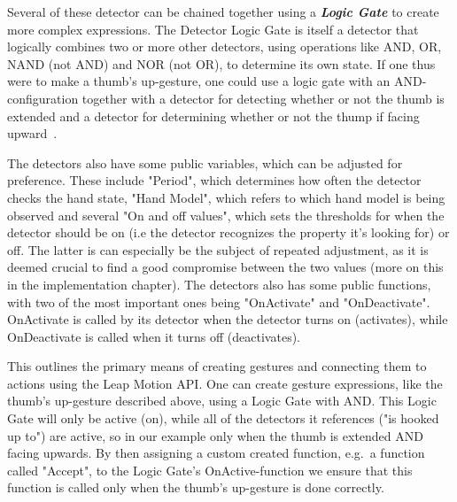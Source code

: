 Several of these detector can be chained together using a \textbf{\textit{Logic Gate}} to create more complex expressions. 
The Detector Logic Gate is itself a detector that logically combines two or more other detectors, using operations like AND, OR, NAND (not AND) and NOR (not OR), 
to determine its own state.
If one thus were to make a thumb's up-gesture, one could use a logic gate with an AND-configuration together with a detector for detecting whether or not the
thumb is extended and a detector for determining whether or not the thump if facing upward~\citep{LeapMotion2016}. 

The detectors also have some public variables, which can be adjusted for preference. These include "Period", which determines how often the detector checks the hand state,
"Hand Model", which refers to which hand model is being observed and several "On and off values", which sets the thresholds for when the detector should be on (i.e the
detector recognizes the property it's looking for) or off. The latter is can especially be the subject of repeated adjustment, as it is deemed crucial to find a good
compromise between the two values (more on this in the implementation chapter). The detectors also has some public functions, with two of the most important ones being
"OnActivate" and "OnDeactivate". OnActivate is called by its detector when the detector turns on (activates), while OnDeactivate is called when it turns off (deactivates). 

This outlines the primary means of creating gestures and connecting them to actions using the Leap Motion API. One can create gesture expressions, like the thumb's up-gesture
described above, using a Logic Gate with AND. This Logic Gate will only be active (on), while all of the detectors it references ("is hooked up to") are active, so in our example
only when the thumb is extended AND facing upwards. By then assigning a custom created function, e.g.~a function called "Accept", to the Logic Gate's OnActive-function we
ensure that this function is called only when the thumb's up-gesture is done correctly. 








